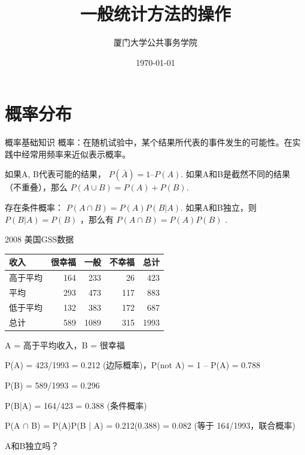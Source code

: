 \documentclass[presentation]{beamer}
\author{厦门大学公共事务学院}
\date{\today}
\title{一般统计方法的操作}
\begin{document}
\maketitle

\section{概率分布}
\label{sec:orga0c69b4}
\begin{frame}[label={sec:org715bbf1}]{概率基础知识}
概率：在随机试验中，某个结果所代表的事件发生的可能性。在实践中经常用频率来近似表示概率。

如果A, B代表可能的结果， \(P(\bar{A}) = 1 – P(A)\).  
如果A和B是截然不同的结果（不重叠），那么 \(P(A\cup B) = P(A) + P(B)\). 

存在条件概率： \(P(A \cap B) = P(A)P(B|A)\). 
如果A和B独立，则 \(P(B|A) = P(B)\) ，那么有 \(P(A \cap B) = P(A)P(B)\) .

\alert{2008 美国GSS数据}
\begin{center}
\begin{tabular}{lrrrr}
收入 & 很幸福 & 一般 & 不幸福 & 总计\\
\hline
高于平均 & 164 & 233 & 26 & 423\\
平均 & 293 & 473 & 117 & 883\\
低于平均 & 132 & 383 & 172 & 687\\
总计 & 589 & 1089 & 315 & 1993\\
\end{tabular}
\end{center}
A = 高于平均收入，B = 很幸福  

P(A) = 423/1993 = 0.212 (边际概率)，P(not A) = 1 – P(A) = 0.788  

P(B) = 589/1993 = 0.296  

P(B|A) = 164/423 = 0.388 (条件概率)  

P(A \(\cap\) B) = P(A)P(B | A) = 0.212(0.388) = 0.082 (等于 164/1993，联合概率)  

A和B独立吗？
\end{frame}
\end{document}
